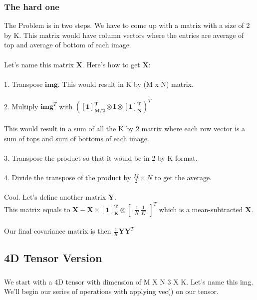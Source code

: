 \documentclass{article}
\newcommand{\matr}[1]{\mathbf{#1}}
\begin{document}
		\subsubsection{The hard one} %
		The Problem is in two steps. We have to come up with a matrix with a size of 2 by K.
		This matrix would have column vectors where the entries are average of top and average of bottom of each image.\\
		\\
		Let's name this matrix $\matr{X}$. Here's how to get $\matr{X}$:\\
		\\
		1. Transpose $\matr{img}$. This would result in K by (M x N) matrix.\\
		\\
		2. Multiply $\matr{img}^{T}$ with $(\matr{[1]^{T}_{M/2}} \otimes \matr{I} \otimes \matr{[1]^{T}_{N}})^{T}$\\
		\\
		This would result in a sum of all the K by 2 matrix where each row vector is a sum of tops and sum of bottoms of each image.\\
		\\
		3. Transpose the product so that it would be in 2 by K format.\\
		\\
		4. Divide the transpose of the product by $\frac{M}{2} \times N$ to get the average.\\
		\\
		Cool. Let's define another matrix $\matr{Y}$.  \\
		This matrix equals to $\matr{X} - \matr{X} \times \matr{[1]^{T}_{K}} \otimes  
		\begin{bmatrix}
		{\frac{1}{K} \ \frac{1}{K}}
		\end{bmatrix}^{T}
		$ which is a mean-subtracted $\matr{X}$.\\
		\\
		Our final covariance matrix is then $\frac{1}{K}\matr{Y}\matr{Y}^{T}$

	\subsection{4D Tensor Version} %
		\subsubsection{} %
		We start with a 4D tensor with dimension of M X N 3 X K. Let's name this img. 
		We'll begin our series of operations with applying vec() on our tensor.\\
\end{document}
